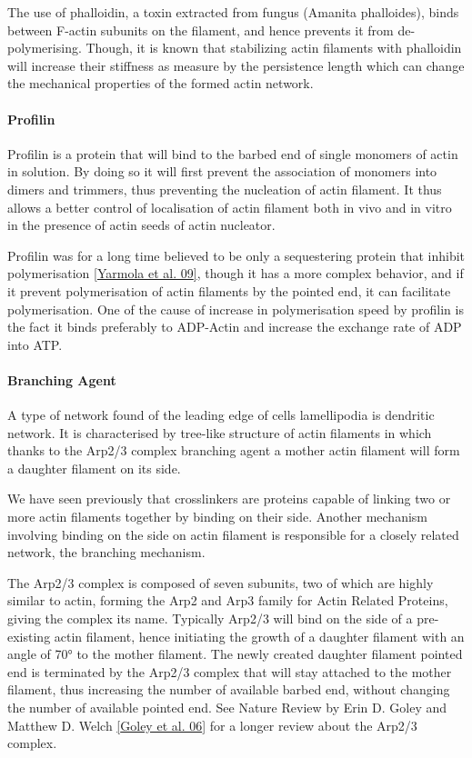 \documentclass[A4paperpaper,11pt,english]{sphinxmanual}
\begin{document}
The use of phalloidin, a toxin extracted from fungus (Amanita phalloides), binds
between F-actin subunits on the filament, and hence  prevents it from
de-polymerising.  Though, it is known that stabilizing actin filaments with
phalloidin will increase their stiffness as measure by the persistence length which can change the
mechanical properties of the formed actin network.


\paragraph{Profilin}
\label{index-latex:profilin}
Profilin is a protein that will bind to the barbed end of single monomers of
actin in solution.  By doing so it will first prevent the association of
monomers into dimers and trimmers, thus preventing the nucleation of actin
filament. It thus allows a better control of localisation of actin filament
both in vivo and in vitro in the presence of actin seeds of actin nucleator.

Profilin was for a long time believed to be only a sequestering protein
that inhibit polymerisation {\hyperref[index-latex:yarmola2009]{{[}Yarmola et al. 09{]}}}, though it has a more complex
behavior, and if it prevent polymerisation of actin filaments by the pointed
end, it can facilitate polymerisation. One of the cause of increase in
polymerisation speed by profilin is the fact it binds preferably to ADP-Actin
and increase the exchange rate of ADP into ATP.


\paragraph{Branching Agent}
\label{index-latex:branching-agent}
A type of network found of the leading edge of cells lamellipodia is dendritic
network. It is characterised by tree-like structure of actin filaments in which
thanks to the Arp2/3 complex branching agent a mother actin filament will form a
daughter filament on its side.

We have seen previously that crosslinkers are proteins capable of linking two
or more actin filaments together by binding on their side. Another mechanism
involving binding on the side on actin filament is responsible for a closely
related network, the branching mechanism.

The Arp2/3 complex is composed of seven subunits, two of which are highly
similar to actin, forming the Arp2 and Arp3 family for Actin Related Proteins,
giving the complex its name. Typically Arp2/3 will bind on the side of a pre-existing
actin filament, hence initiating the growth of a daughter filament with an angle of
70° to the mother filament. The newly created daughter filament pointed end
is terminated by the Arp2/3 complex that will stay attached to the mother
filament, thus increasing the number of available barbed end, without changing
the number of available pointed end. See Nature Review by Erin D. Goley and
Matthew D. Welch {\hyperref[index-latex:goley2006]{{[}Goley et al. 06{]}}} for  a longer review about the Arp2/3
complex.
\end{document}
